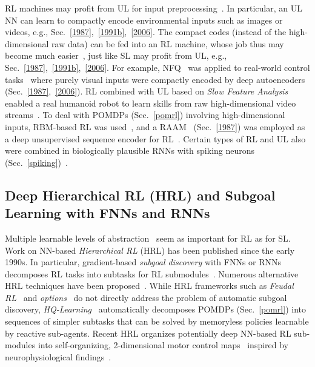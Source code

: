 \documentclass[letterpaper]{article}
\begin{document}
\begin{sloppypar}
RL machines 
may profit from UL for input preprocessing~\citep[e.g.,][]{Jodogne07}.
In particular, an UL NN  can 
learn to compactly encode environmental inputs such as images or videos,
e.g., Sec.~\ref{1987},~\ref{1991b},~\ref{2006}.
The compact codes (instead of the high-dimensional 
raw data) can be fed into an RL machine,
whose job thus may become much easier~\citep{Legenstein2010,cuccu2011},
just like SL may profit from UL, e.g., Sec.~\ref{1987},~\ref{1991b},~\ref{2006}.
For example, NFQ~\citep{nfq} was applied to real-world control tasks~\citep{lange,rieijcnn12} 
where purely visual inputs were compactly encoded by deep
autoencoders (Sec.~\ref{1987},~\ref{2006}). 
RL combined with 
UL based on {\em Slow Feature Analysis}~\citep{WisSej2002,DBLP:journals/neco/KompellaLS12} enabled
a real humanoid robot to learn skills from raw high-dimensional video streams~\citep{luciwkomp13}.
To deal with POMDPs (Sec.~\ref{pomrl}) involving high-dimensional inputs, 
RBM-based RL was used~\citep{otsuka2010phd},
and a RAAM~\citep{pollack1988implications} (Sec.~\ref{1987})
was employed as a deep unsupervised sequence encoder  
 for RL~\citep{Gisslen2011agi}.
Certain types of RL and UL also were combined in biologically plausible RNNs with spiking 
neurons (Sec.~\ref{spiking})~\citep[e.g.,][]{yin2012,maass2013,rezende2014}.



\subsection{Deep Hierarchical RL (HRL) and Subgoal Learning with FNNs and RNNs}
\label{subrl}
 
Multiple learnable 
levels of abstraction~\citep{Fu:77,Lenat:84,Ring:94,bengio2013tpami,lideng2014} seem as important for RL as for SL. 
Work on NN-based {\em Hierarchical RL} (HRL) has been
published since the early 1990s. 
In particular,
gradient-based {\em subgoal discovery} with FNNs or RNNs decomposes RL tasks into subtasks
for RL submodules~\citep{Schmidhuber:91icannsubgoals,SchmidhuberWahnsiedler:92sab}.
Numerous alternative HRL techniques have been proposed~\citep[e.g.,][]{Ring:91,Ring:94,Jameson:91,TenenbergKarlssonWhitehead,Weiss:94a,partigame,Precup:MTimeNIPS98,Dietterich:MAXQ,menache2002,DoyaSamejimaKatagiriKawato,ghavamzadehICML03,barto2003hrl,SamejimaDoyaKawato,Bakker:04ias,stoneML05,simsek2008skill}.
While HRL frameworks such as {\em Feudal RL}~\citep{Dayan:93} 
and {\em options}~\citep{sutton1999between,Barto:04,Singh:05nips} 
do not directly address the problem of automatic subgoal discovery,
{\em HQ-Learning}~\citep{Wiering:97ab}  automatically decomposes POMDPs (Sec.~\ref{pomrl})
into sequences of simpler subtasks that can be solved by memoryless policies
learnable by reactive sub-agents.    
Recent HRL organizes potentially deep NN-based RL sub-modules into
self-organizing, 2-dimensional motor control maps~\citep{ring:icdl2011}
inspired by neurophysiological findings~\citep{Graziano:book}.




\end{sloppypar}
\end{document}
